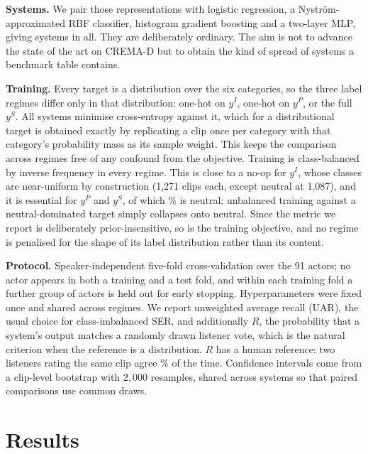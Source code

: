 \documentclass{article}
\begin{document}
\textbf{Systems.} We pair those representations with logistic regression, a
Nystr\"om-approximated RBF classifier, histogram gradient boosting and a
two-layer MLP, giving \NSystemsWord{} systems in all. They are deliberately
ordinary. The aim is not to advance the state of the art on CREMA-D but to
obtain the kind of spread of systems a benchmark table contains.

\textbf{Training.} Every target is a distribution over the six categories, so
the three label regimes differ only in that distribution: one-hot on $y^{I}$,
one-hot on $y^{P}$, or the full $y^{S}$. All systems minimise cross-entropy
against it, which for a distributional target is obtained exactly by replicating
a clip once per category with that category's probability mass as its sample
weight. This keeps the comparison across regimes free of any confound from the
objective. Training is class-balanced by inverse frequency in every regime.
This is close to a no-op for $y^{I}$, whose classes are near-uniform by
construction (1{,}271 clips each, except neutral at 1{,}087), and it is
essential for $y^{P}$ and $y^{S}$, of which \NeutralShare\% is neutral:
unbalanced training against a neutral-dominated target simply collapses onto
neutral. Since the metric we report is deliberately prior-insensitive, so is the
training objective, and no regime is penalised for the shape of its label
distribution rather than its content.

\textbf{Protocol.} Speaker-independent five-fold cross-validation over the 91
actors; no actor appears in both a training and a test fold, and within each
training fold a further group of actors is held out for early stopping.
Hyperparameters were fixed once and shared across regimes. We report unweighted
average recall (UAR), the usual choice for class-imbalanced SER, and
additionally $R$, the probability that a system's output matches a randomly
drawn listener vote, which is the natural criterion when the reference is a
distribution. $R$ has a human reference: two listeners rating the same clip
agree \RaterRater\% of the time. Confidence intervals come from a clip-level
bootstrap with $2{,}000$ resamples, shared across systems so that paired
comparisons use common draws.

\section{Results}
\label{sec:results}


\end{document}
